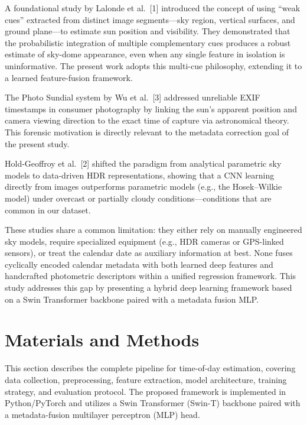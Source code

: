 \documentclass[9pt, a4paper, twocolumn]{article}
\begin{document}
A foundational study by Lalonde et al.~[1] introduced the concept of using ``weak cues'' extracted from distinct image segments---sky region, vertical surfaces, and ground plane---to estimate sun position and visibility. They demonstrated that the probabilistic integration of multiple complementary cues produces a robust estimate of sky-dome appearance, even when any single feature in isolation is uninformative. The present work adopts this multi-cue philosophy, extending it to a learned feature-fusion framework.

The Photo Sundial system by Wu et al.~[3] addressed unreliable EXIF timestamps in consumer photography by linking the sun's apparent position and camera viewing direction to the exact time of capture via astronomical theory. This forensic motivation is directly relevant to the metadata correction goal of the present study.

Hold-Geoffroy et al.~[2] shifted the paradigm from analytical parametric sky models to data-driven HDR representations, showing that a CNN learning directly from images outperforms parametric models (e.g., the Hosek--Wilkie model) under overcast or partially cloudy conditions---conditions that are common in our dataset.

These studies share a common limitation: they either rely on manually engineered sky models, require specialized equipment (e.g., HDR cameras or GPS-linked sensors), or treat the calendar date as auxiliary information at best. None fuses cyclically encoded calendar metadata with both learned deep features and handcrafted photometric descriptors within a unified regression framework. This study addresses this gap by presenting a hybrid deep learning framework based on a Swin Transformer backbone paired with a metadata fusion MLP.


\section{Materials and Methods}

This section describes the complete pipeline for time-of-day estimation, covering data collection, preprocessing, feature extraction, model architecture, training strategy, and evaluation protocol. The proposed framework is implemented in Python/PyTorch and utilizes a Swin Transformer (Swin-T) backbone paired with a metadata-fusion multilayer perceptron (MLP) head.
\end{document}
